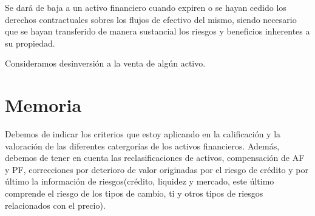 Se dará de baja a un activo financiero cuando expiren o se hayan cedido los derechos contractuales sobres los flujos de efectivo del mismo, siendo necesario que se hayan transferido de manera sustancial los riesgos y beneficios inherentes a su propiedad. 








Consideramos desinversión a la venta de algún activo. 
\newpage
\section{Memoria}

Debemos de indicar los criterios que estoy aplicando en la calificación y la valoración de las diferentes catergorías de los activos financieros. 
Además, debemos de tener en cuenta las reclasificaciones de activos, compensación de AF y PF, correcciones por deterioro de valor originadas por el riesgo de crédito y por último la información de riesgos(crédito, liquidez y mercado, este último comprende el riesgo de los tipos de cambio, ti y otros tipos de riesgos relacionados con el precio).


